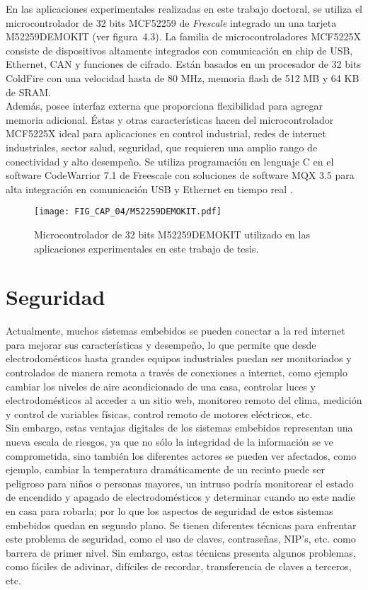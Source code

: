 En las aplicaciones experimentales realizadas en este trabajo doctoral, se utiliza el microcontrolador de 32 bits MCF52259 de \textit{Frescale} integrado un una tarjeta M52259DEMOKIT (ver figura~4.3). La familia de microcontroladores MCF5225X consiste de dispositivos altamente integrados con comunicación en chip de USB, Ethernet, CAN y funciones de cifrado. Están basados en un procesador de 32 bits ColdFire con una velocidad hasta de 80 MHz, memoria flash de 512 MB y 64 KB de SRAM. \\

Además, posee interfaz externa que proporciona flexibilidad para agregar memoria adicional. Éstas y otras características hacen del microcontrolador MCF5225X ideal para aplicaciones en control industrial, redes de internet industriales, sector salud, seguridad, que requieren una amplio rango de conectividad y alto desempeño. Se utiliza programación en lenguaje C en el software CodeWarrior 7.1 de Freescale con soluciones de software MQX 3.5 para alta integración en comunicación USB y Ethernet en tiempo real \cite{F_2008}.

\begin{figure}[!htbp] %
	\center
	\texttt{[image: FIG\_CAP\_04/M52259DEMOKIT.pdf]}   
	\caption{Microcontrolador de 32 bits M52259DEMOKIT utilizado en las aplicaciones experimentales en este trabajo de tesis.}
\end{figure}  

\section{Seguridad}
Actualmente, muchos sistemas embebidos se pueden conectar a la red internet para mejorar sus características y desempeño, lo que permite que desde electrodomésticos hasta grandes equipos industriales puedan ser monitoriados y controlados de manera remota a través de conexiones a internet, como ejemplo cambiar los niveles de aire acondicionado de una casa, controlar luces y electrodomésticos al acceder a un sitio web, monitoreo remoto del clima, medición y control de variables físicas, control remoto de motores eléctricos, etc. \\

Sin embargo, estas ventajas digitales de los sistemas embebidos representan una nueva escala de riesgos, ya que no sólo la integridad de la información se ve comprometida, sino también los diferentes actores se pueden ver afectados, como ejemplo, cambiar la temperatura dramáticamente de un recinto puede ser peligroso para niños o personas mayores, un intruso podría monitorear el estado de encendido y apagado de electrodomésticos y determinar cuando no este nadie en casa para robarla; por lo que los aspectos de seguridad de estos sistemas embebidos quedan en segundo plano. Se tienen diferentes técnicas para enfrentar este problema de seguridad, como el uso de claves, contraseñas, NIP's, etc. como barrera de primer nivel. Sin embargo, estas técnicas presenta algunos problemas, como fáciles de adivinar, difíciles de recordar, transferencia de claves a terceros, etc. \\


